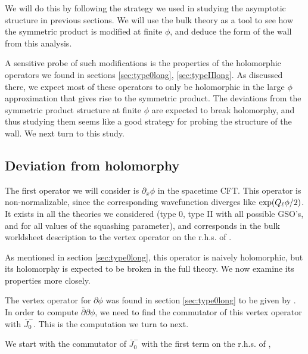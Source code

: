 \documentclass[12pt]{article}
\numberwithin{equation}{section}
\def\exp{{\rm exp}}
\begin{document}
We will do this by following the strategy we used in studying the asymptotic structure in previous sections. We will use the bulk theory as a tool to see how the symmetric product is modified at finite $\phi$, and deduce the form of the wall from this analysis. 

A sensitive probe of such modifications is the properties of the holomorphic operators we found in sections \ref{sec:type0long}, \ref{sec:typeIIlong}. As discussed there, we expect most of these operators to only be holomorphic in the large $\phi$ approximation that gives rise to the symmetric product. The deviations from the symmetric product structure at finite $\phi$ are expected to break holomorphy, and thus studying them seems like a good strategy for probing the structure of the wall. We next turn to this study. 

\subsection{Deviation from holomorphy}
\label{sec:nonholo}
The first operator we will consider is $\partial_x\phi$ in the spacetime CFT. This operator is non-normalizable, since the corresponding wavefunction diverges like $\exp(Q_\ell\phi/2)$. It exists in all the theories we considered (type 0, type II with all possible GSO's, and for all values of the squashing parameter), and corresponds in the bulk worldsheet description to the vertex operator on the r.h.s. of \dualbbzero. 

As mentioned in section \ref{sec:type0long}, this operator is naively holomorphic, but its holomorphy is expected to be broken in the full theory. We now examine its properties more closely. 

The vertex operator for $\partial\phi$ was found in section \ref{sec:type0long} to be given by \dualbbzero. In order to compute $\bar\partial\partial\phi$, we need to find the commutator of this vertex operator with $\bar J_0^-$. This is the computation we turn to next. 

We start with the commutator of $\bar J_0^-$ with the first term on the r.h.s. of \dualbbzero ,
\end{document}
